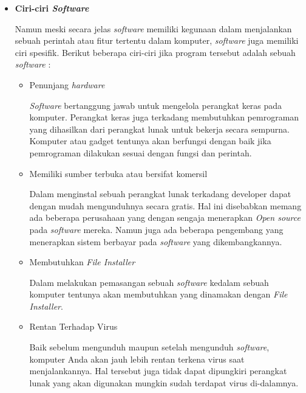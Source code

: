 \documentclass[12pt]{article}
\begin{document}
    \begin{itemize}
        
        \item \textbf{Ciri-ciri \textit{Software}} 
        \par
        Namun meski secara jelas \textit{software} memiliki kegunaan dalam menjalankan sebuah perintah atau fitur tertentu dalam komputer, \textit{software} juga memiliki ciri spesifik. Berikut beberapa ciri-ciri jika program tersebut adalah sebuah \textit{software} :
        \begin{itemize}
            \item Penunjang \textit{hardware}
            \par
            \textit{Software} bertanggung jawab untuk mengelola perangkat keras pada komputer. Perangkat keras juga terkadang membutuhkan pemrograman yang dihasilkan dari perangkat lunak untuk bekerja secara sempurna. Komputer atau gadget tentunya akan berfungsi dengan baik jika pemrograman dilakukan sesuai dengan fungsi dan perintah.\cite{IDCloudHost}\cite{JagoanHosting}
            \item Memiliki sumber terbuka atau bersifat komersil
            \par
            Dalam menginstal sebuah perangkat lunak terkadang developer dapat dengan mudah mengunduhnya secara gratis. Hal ini disebabkan memang ada beberapa perusahaan yang dengan sengaja menerapkan \textit{Open source} pada \textit{software} mereka. Namun juga ada beberapa pengembang yang menerapkan sistem berbayar pada \textit{software} yang dikembangkannya.\cite{IDCloudHost}
            \item Membutuhkan \textit{File Installer}
            \par
            Dalam melakukan pemasangan sebuah \textit{software} kedalam sebuah komputer tentunya akan membutuhkan yang dinamakan dengan \textit{File Installer}.\cite{IDCloudHost}
            \item Rentan Terhadap Virus
            \par
            Baik sebelum mengunduh maupun setelah mengunduh \textit{software}, komputer Anda akan jauh lebih rentan terkena virus saat menjalankannya. Hal tersebut juga tidak dapat dipungkiri perangkat lunak yang akan digunakan mungkin sudah terdapat virus di-dalamnya.\cite{JagoanHosting}
        \end{itemize}


\end{itemize}
\end{document}
